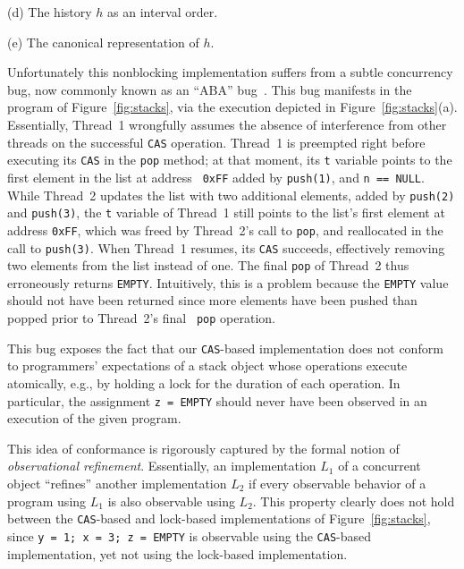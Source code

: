 \begin{figure*}[t]
\begin{minipage}[c]{130mm}
     \bigskip
     \centering
    
    
    \smallskip
    (d) The history $h$ as an interval order.
    
     \bigskip
     \centering
    
    
    \smallskip
    (e) The canonical representation of $h$.
    
  \end{minipage}
  \caption{An implementation of Treiber's stack. The {\tt pop} operation
  returns the {\tt EMPTY} when the stack is empty.}
  \label{fig:stacks}
\end{figure*}

Unfortunately this nonblocking implementation suffers from a subtle concurrency
bug, now commonly known as an ``ABA'' bug~\cite{tr/ibm/Michael04}. This bug
manifests in the program of Figure~\ref{fig:stacks}, via the 
execution depicted in Figure~\ref{fig:stacks}(a). 
Essentially, Thread~1 wrongfully assumes the absence of interference
from other threads on the successful {\tt CAS} operation. Thread~1 is preempted
right before executing its {\tt CAS} in the {\tt pop} method; at that moment,
its {\tt t} variable points to the first element in the list at address {\tt
0xFF} added by {\tt push(1)}, and {\tt n == NULL}. While Thread~2 updates the
list with two additional elements, added by {\tt push(2)} and {\tt push(3)},
the {\tt t} variable of Thread~1 still points to the list's first element at
address {\tt 0xFF}, which was freed by Thread~2's call to {\tt pop}, and
reallocated in the call to {\tt push(3)}. When Thread~1 resumes, its {\tt CAS}
succeeds, effectively removing two elements from the list instead of one. The
final {\tt pop} of Thread~2 thus erroneously returns {\tt EMPTY}. Intuitively,
this is a problem because the {\tt EMPTY} value should not have been returned
since more elements have been pushed than popped prior to Thread~2's final {\tt
pop} operation.

This bug exposes the fact that our {\tt CAS}-based implementation does not
conform to programmers' expectations of a stack object whose operations execute
atomically, e.g., by holding a lock for the duration of each operation.
In particular, the assignment {\tt z = EMPTY} should never have
been observed in an execution of the given program. 

This idea of conformance is rigorously captured by the formal notion of \emph{observational refinement}.
Essentially, an implementation $L_1$ of a concurrent object ``refines'' another
implementation $L_2$ if every observable behavior of a program using $L_1$ is
also observable using $L_2$. This property clearly does not hold between the
{\tt CAS}-based and lock-based implementations of Figure~\ref{fig:stacks},
since {\tt y = 1; x = 3; z = EMPTY} is observable using the {\tt CAS}-based
implementation, yet not using the lock-based implementation.
